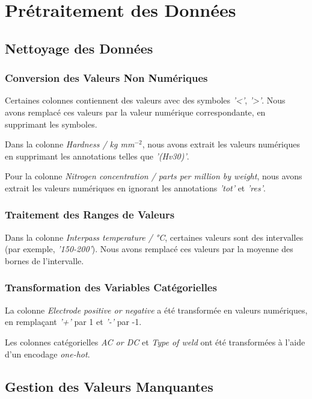 \documentclass{article}
\begin{document}
\section{Prétraitement des Données}

\subsection{Nettoyage des Données}

\subsubsection{Conversion des Valeurs Non Numériques}

Certaines colonnes contiennent des valeurs avec des symboles \textit{'<'}, \textit{'>'}. Nous avons remplacé ces valeurs par la valeur numérique correspondante, en supprimant les symboles.

Dans la colonne \textit{Hardness / kg mm$^{-2}$}, nous avons extrait les valeurs numériques en supprimant les annotations telles que \textit{'(Hv30)'}.

Pour la colonne \textit{Nitrogen concentration / parts per million by weight}, nous avons extrait les valeurs numériques en ignorant les annotations \textit{'tot'} et \textit{'res'}.

\subsubsection{Traitement des Ranges de Valeurs}

Dans la colonne \textit{Interpass temperature / °C}, certaines valeurs sont des intervalles (par exemple, \textit{'150-200'}). Nous avons remplacé ces valeurs par la moyenne des bornes de l'intervalle.

\subsubsection{Transformation des Variables Catégorielles}

La colonne \textit{Electrode positive or negative} a été transformée en valeurs numériques, en remplaçant \textit{'+'} par 1 et \textit{'-'} par -1.

Les colonnes catégorielles \textit{AC or DC} et \textit{Type of weld} ont été transformées à l'aide d'un encodage \textit{one-hot}.

\subsection{Gestion des Valeurs Manquantes}
\end{document}
